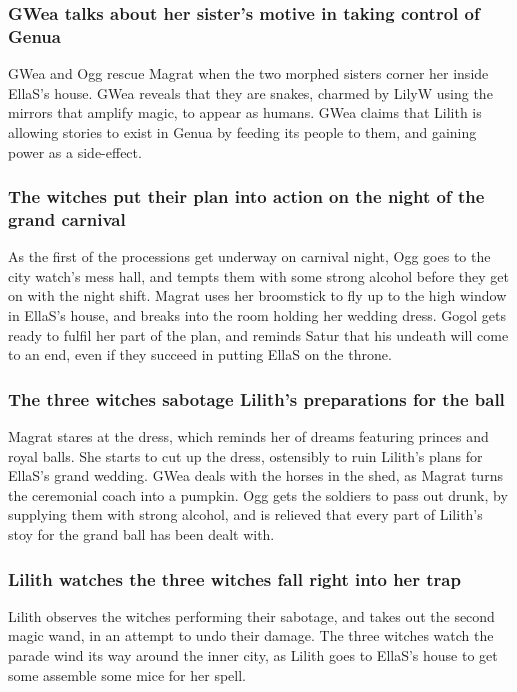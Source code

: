 \subsubsection{\Gls{GWea} talks about her sister's motive in taking control of Genua}
\Gls{GWea} and \Gls{Ogg} rescue \Gls{Magrat} when the two morphed sisters corner her inside
\Gls{EllaS}'s house. \Gls{GWea} reveals that they are snakes, charmed by \Gls{LilyW} using the
mirrors that amplify magic, to appear as humans. \Gls{GWea} claims that \Gls{Lilith} is allowing
stories to exist in Genua by feeding its people to them, and gaining power as a side-effect.

\subsubsection{The witches put their plan into action on the night of the grand carnival}
As the first of the processions get underway on carnival night, \Gls{Ogg} goes to the city watch's
mess hall, and tempts them with some strong alcohol before they get on with the night shift.
\Gls{Magrat} uses her broomstick to fly up to the high window in \Gls{EllaS}'s house, and breaks
into the room holding her wedding dress. \Gls{Gogol} gets ready to fulfil her part of the plan,
and reminds \Gls{Satur} that his undeath will come to an end, even if they succeed in putting
\Gls{EllaS} on the throne.

\subsubsection{The three witches sabotage \Gls{Lilith}'s preparations for the ball}
\Gls{Magrat} stares at the dress, which reminds her of dreams featuring princes and royal balls. She
starts to cut up the dress, ostensibly to ruin \Gls{Lilith}'s plans for \Gls{EllaS}'s grand wedding.
\Gls{GWea} deals with the horses in the shed, as \Gls{Magrat} turns the ceremonial coach into a
pumpkin. \Gls{Ogg} gets the soldiers to pass out drunk, by supplying them with strong alcohol, and
is relieved that every part of \Gls{Lilith}'s stoy for the grand ball has been dealt with.

\subsubsection{\Gls{Lilith} watches the three witches fall right into her trap}
\Gls{Lilith} observes the witches performing their sabotage, and takes out the second magic wand,
in an attempt to undo their damage. The three witches watch the parade wind its way around the
inner city, as \Gls{Lilith} goes to \Gls{EllaS}'s house to get some assemble some mice for her
spell.

